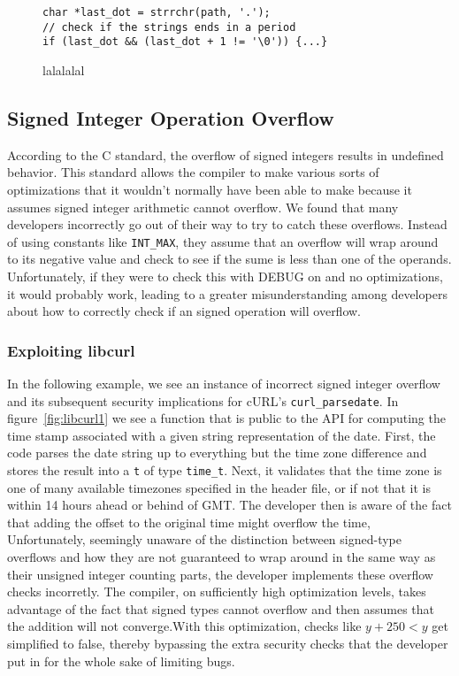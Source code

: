\documentclass[9pt,twocolumn]{article}
\begin{document}
\begin{figure}
\begin{lstlisting}
char *last_dot = strrchr(path, '.');
// check if the strings ends in a period
if (last_dot && (last_dot + 1 != '\0')) {...}
\end{lstlisting}
\label{fig:svn}
\caption{lalalalal}
\end{figure}



\subsection{Signed Integer Operation Overflow}
According to the C standard, the overflow of signed integers results in undefined behavior. This standard allows the compiler to make various sorts of optimizations that it wouldn't normally have been able to make because it assumes signed integer arithmetic cannot overflow. We found that many developers incorrectly go out of their way to try to catch these overflows. Instead of using constants like \texttt{INT\_MAX}, they assume that an overflow will wrap around to its negative value and check to see if the sume is less than one of the operands. Unfortunately, if they were to check this with DEBUG on and no optimizations, it would probably work, leading to a greater misunderstanding among developers about how to correctly check if an signed operation will overflow.

\subsubsection{Exploiting libcurl}
In the following example, we see an instance of incorrect signed integer overflow and its subsequent security implications for cURL's \texttt{curl\_parsedate}. In figure~\ref{fig:libcurl1} we see a function that is public to the API for computing the time stamp associated with a given string representation of the date. First, the code parses the date string up to everything but the time zone difference and stores the result into a \texttt{t} of type \texttt{time\_t}. Next, it validates that the time zone is one of many available timezones specified in the header file, or if not that it is within 14 hours ahead or behind of GMT. The developer then is aware of the fact that adding the offset to the original time might overflow the time, Unfortunately, seemingly unaware of the distinction between signed-type overflows and how they are not guaranteed to wrap around in the same way as their unsigned integer counting parts, the developer implements these overflow checks incorretly. The compiler, on sufficiently high optimization levels, takes advantage of the fact that signed types cannot overflow and then assumes that the addition will not converge.With this optimization, checks like $y + 250 < y$ get simplified to false, thereby bypassing the extra security checks that the developer put in for the whole sake of limiting bugs.
\end{document}
